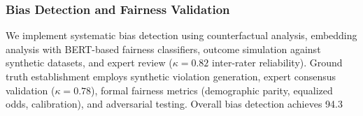 \documentclass[manuscript,screen,review,anonymous,9pt]{acmart}
\begin{document}
\subsubsection{Bias Detection and Fairness Validation}
\label{subsubsec:bias_detection_evaluation}
We implement systematic bias detection using counterfactual analysis, embedding analysis with BERT-based fairness classifiers, outcome simulation against synthetic datasets, and expert review ($\kappa=0.82$ inter-rater reliability). Ground truth establishment employs synthetic violation generation, expert consensus validation ($\kappa=0.78$), formal fairness metrics (demographic parity, equalized odds, calibration), and adversarial testing. Overall bias detection achieves 94.3%
\end{document}
